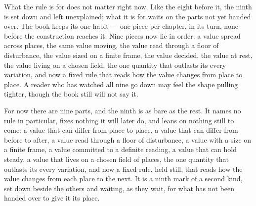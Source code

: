 What the rule is for does not matter right now. Like the eight before it, the ninth is set down and left unexplained; what it is for waits on the parts not yet handed over. The book keeps its one habit --- one piece per chapter, in its turn, none before the construction reaches it. Nine pieces now lie in order: a value spread across places, the same value moving, the value read through a floor of disturbance, the value sized on a finite frame, the value decided, the value at rest, the value living on a chosen field, the one quantity that outlasts its every variation, and now a fixed rule that reads how the value changes from place to place. A reader who has watched all nine go down may feel the shape pulling tighter, though the book still will not say it.

For now there are nine parts, and the ninth is as bare as the rest. It names no rule in particular, fixes nothing it will later do, and leans on nothing still to come: a value that can differ from place to place, a value that can differ from before to after, a value read through a floor of disturbance, a value with a size on a finite frame, a value committed to a definite reading, a value that can hold steady, a value that lives on a chosen field of places, the one quantity that outlasts its every variation, and now a fixed rule, held still, that reads how the value changes from each place to the next. It is a ninth mark of a second kind, set down beside the others and waiting, as they wait, for what has not been handed over to give it its place.
